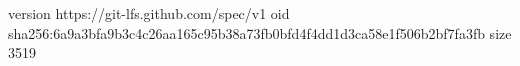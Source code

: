 version https://git-lfs.github.com/spec/v1
oid sha256:6a9a3bfa9b3c4c26aa165c95b38a73fb0bfd4f4dd1d3ca58e1f506b2bf7fa3fb
size 3519
